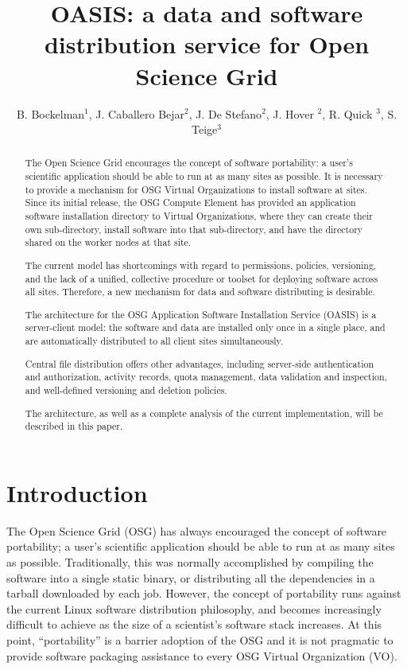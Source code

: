\documentclass[a4paper]{jpconf}
\begin{document}
\title{OASIS: a data and software distribution service for Open Science Grid}

\author{B. Bockelman$^1$, J. Caballero Bejar$^2$, J. De Stefano$^2$, J. Hover $^2$, R. Quick $^3$, S. Teige$^3$}

\address{$^1$ University of Nebraska-Lincoln, Lincoln, NE 68588, USA}
\address{$^2$ Brookhaven National Laboratory, PO BOX 5000 Upton, NY 11973, USA}
\address{$^3$ Indiana University, Bloomington, IN 47404, USA}


\begin{abstract}
The Open Science Grid encourages the concept of software portability: 
a user's scientific application should be able to run at as many sites as
possible.
It is necessary to provide a mechanism for OSG Virtual Organizations to install software at sites. 
Since its initial release, the OSG Compute Element has provided an application
software installation directory to Virtual Organizations, where they can create
their own sub-directory, install software into that sub-directory, and have the
directory shared on the worker nodes at that site.

The current model has shortcomings with regard to permissions,
policies, versioning, and the lack of a unified, collective procedure or toolset for deploying software across all sites. 
Therefore, a new mechanism for data and software distributing is desirable. 

The architecture for the OSG Application Software Installation Service (OASIS) is a server-client model: 
the software and data are installed only once in a single place, 
and are automatically distributed to all client sites simultaneously.

Central file distribution offers other advantages, 
including server-side authentication and authorization, activity records, quota management, 
data validation and inspection, and well-defined versioning and deletion policies.

The architecture, as well as a complete analysis of the current implementation, will be described in this paper. 
\end{abstract}

\section{Introduction}

The Open Science Grid (OSG) \cite{osg} has always encouraged the concept of software portability;
a user's scientific application should be able to run at as many sites as
possible.
Traditionally, this was normally accomplished by compiling the software into a
single static binary, or distributing all the dependencies in a tarball downloaded by each job.  
However, the concept of portability runs against the current Linux software distribution philosophy, 
and becomes increasingly difficult to achieve as the size of a scientist’s software stack increases.  
At this point, “portability” is a barrier adoption of the OSG and 
it is not pragmatic to provide software packaging assistance to every OSG Virtual Organization (VO).
\end{document}
